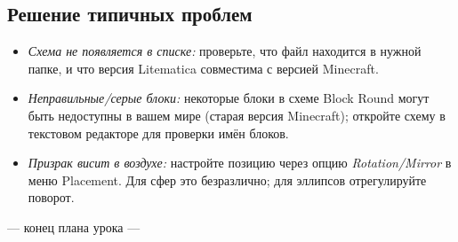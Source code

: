 \documentclass[12pt,a4paper]{scrartcl}
\begin{document}
\subsection{Решение типичных проблем}
\begin{itemize}[leftmargin=1.3em,itemsep=0.15em,topsep=0.3em,nosep]
  \item \emph{Схема не появляется в списке:} проверьте, что файл находится в нужной папке, и что версия Litematica совместима с версией Minecraft.
  \item \emph{Неправильные/серые блоки:} некоторые блоки в схеме Block Round могут быть недоступны в вашем мире (старая версия Minecraft); откройте схему в текстовом редакторе для проверки имён блоков.
  \item \emph{Призрак висит в воздухе:} настройте позицию через опцию \emph{Rotation/Mirror} в меню Placement. Для сфер это безразлично; для эллипсов отрегулируйте поворот.
\end{itemize}

\vspace{2em}
\begin{center}
\color{muted}\small\sffamily
--- конец плана урока ---
\end{center}
\end{document}
